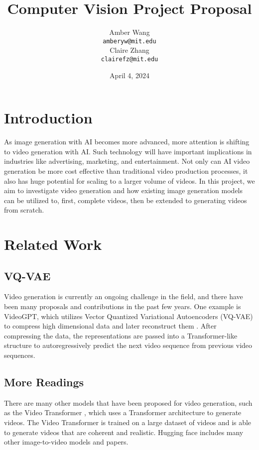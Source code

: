 \documentclass[11pt,a4paper]{article}
\title{Computer Vision Project Proposal}
\author{Amber Wang \\
  \texttt{amberyw@mit.edu} \\\And
  Claire Zhang \\
  \texttt{clairefz@mit.edu} \\}
\date{April 4, 2024}
\begin{document}
\maketitle

\section{Introduction}

As image generation with AI becomes more advanced, more attention is shifting to video generation with AI. Such technology will have important implications in industries like advertising, marketing, and entertainment. Not only can AI video generation be more cost effective than traditional video production processes, it also has huge potential for scaling to a larger volume of videos. In this project, we aim to investigate video generation and how existing image generation models can be utilized to, first, complete videos, then be extended to generating videos from scratch. 

\section{Related Work}

\subsection{VQ-VAE}

Video generation is currently an ongoing challenge in the field, and there have been many proposals and contributions in the past few years. One example is VideoGPT, which utilizes Vector Quantized Variational Autoencoders (VQ-VAE) to compress high dimensional data and later reconstruct them \cite{yan2021videogpt}. After compressing the data, the representations are passed into a Transformer-like structure to autoregressively predict the next video sequence from previous video sequences. 

\subsection{More Readings}

There are many other models that have been proposed for video generation, such as the Video Transformer \cite{chan2021transgan}, which uses a Transformer architecture to generate videos. The Video Transformer is trained on a large dataset of videos and is able to generate videos that are coherent and realistic. Hugging face includes many other image-to-video models and papers.
\end{document}
